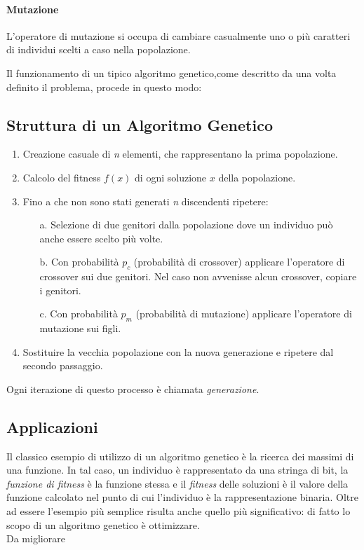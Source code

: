 \documentclass[12pt,a4paper]{report}
\begin{document}
\paragraph{Mutazione} L'operatore di mutazione si occupa di cambiare casualmente uno o più caratteri di individui scelti a caso nella popolazione.

Il funzionamento di un tipico algoritmo genetico,come descritto da \cite{genetic-algorithm-mitchell} una volta definito il problema,  procede in questo modo:

\subsection{Struttura di un Algoritmo Genetico}

\begin{enumerate}
 \item Creazione casuale di \textit{n} elementi, che rappresentano la prima popolazione. 
 \item Calcolo del fitness $f(x)$ di ogni soluzione $x$ della popolazione.
 \item Fino a che non sono stati generati \textit{n} discendenti ripetere:
 \begin{enumerate}
  \item[a.] Selezione di due genitori dalla popolazione dove un individuo può anche essere scelto più volte.
  \item[b.] Con probabilità $p_{c}$ (probabilità di crossover) applicare l'operatore di crossover sui due genitori. Nel caso non avvenisse alcun crossover, copiare i genitori.
  \item[c.] Con probabilità $p_{m}$ (probabilità di mutazione) applicare l'operatore di mutazione sui figli.
 \end{enumerate}
 \item Sostituire la vecchia popolazione con la nuova generazione e ripetere dal secondo passaggio.
\end{enumerate}

Ogni iterazione di questo processo è chiamata \textit{generazione}.

\subsection{Applicazioni}

Il classico esempio di utilizzo di un algoritmo genetico è la ricerca dei massimi di una funzione.
In tal caso, un individuo è rappresentato da una stringa di bit, la \textit{funzione di fitness} è la funzione stessa e il \textit{fitness} delle soluzioni è il valore della funzione calcolato nel punto di cui l'individuo è la rappresentazione binaria.
Oltre ad essere l'esempio più semplice risulta anche quello più significativo: di fatto lo scopo di un algoritmo genetico è ottimizzare.
\\
Da migliorare
\end{document}
